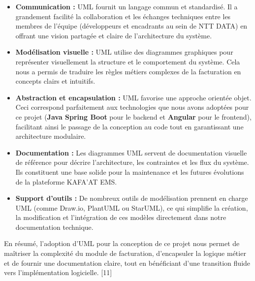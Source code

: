 \documentclass[12pt, a4paper, openany]{report}
\begin{document}
\begin{itemize}[leftmargin=*, itemsep=0.3cm]
    \item \textcolor{primaryBlue}{\textbf{Communication :}} UML fournit un langage commun et standardisé. Il a grandement facilité la collaboration et les échanges techniques entre les membres de l'équipe (développeurs et encadrants au sein de NTT DATA) en offrant une vision partagée et claire de l'architecture du système.
    
    \vspace{-0.4cm}
    \item \textcolor{primaryBlue}{\textbf{Modélisation visuelle :}} UML utilise des diagrammes graphiques pour représenter visuellement la structure et le comportement du système. Cela nous a permis de traduire les règles métiers complexes de la facturation en concepts clairs et intuitifs.
    
    \vspace{-0.4cm}
    \item \textcolor{primaryBlue}{\textbf{Abstraction et encapsulation :}} UML favorise une approche orientée objet. Ceci correspond parfaitement aux technologies que nous avons adoptées pour ce projet (\textbf{Java Spring Boot} pour le backend et \textbf{Angular} pour le frontend), facilitant ainsi le passage de la conception au code tout en garantissant une architecture modulaire.
    
    \vspace{-0.4cm}
    \item \textcolor{primaryBlue}{\textbf{Documentation :}} Les diagrammes UML servent de documentation visuelle de référence pour décrire l'architecture, les contraintes et les flux du système. Ils constituent une base solide pour la maintenance et les futures évolutions de la plateforme KAFA'AT EMS.
    
    \vspace{-0.4cm}
    \item \textcolor{primaryBlue}{\textbf{Support d'outils :}} De nombreux outils de modélisation prennent en charge UML (comme Draw.io, PlantUML ou StarUML), ce qui simplifie la création, la modification et l'intégration de ces modèles directement dans notre documentation technique.
\end{itemize}

\vspace{-0.4cm}
En résumé, l'adoption d'UML pour la conception de ce projet nous permet de maîtriser la complexité du module de facturation, d'encapsuler la logique métier et de fournir une documentation claire, tout en bénéficiant d'une transition fluide vers l'implémentation logicielle. [11]
\end{document}
